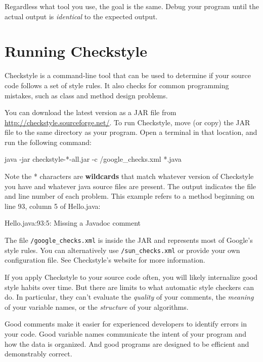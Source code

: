 \documentclass[12pt]{book}
\theoremstyle{exercise}
\newcommand{\java}[1]{\verb"#1"}
\begin{document}
Regardless what tool you use, the goal is the same.
Debug your program until the actual output is {\it identical} to the expected output.


\section{Running Checkstyle}
\label{checkstyle}

Checkstyle is a command-line tool that can be used to determine if your source code follows a set of style rules.
It also checks for common programming mistakes, such as class and method design problems.

You can download the latest version as a JAR file from \url{http://checkstyle.sourceforge.net/}.
To run Checkstyle, move (or copy) the JAR file to the same directory as your program.
Open a terminal in that location, and run the following command:

\begin{stdout}
java -jar checkstyle-*-all.jar -c /google_checks.xml *.java
\end{stdout}

Note the * characters are {\bf wildcards} that match whatever version of Checkstyle you have and whatever java source files are present.
The output indicates the file and line number of each problem.
This example refers to a method beginning on line 93, column 5 of Hello.java:

\begin{stdout}
Hello.java:93:5: Missing a Javadoc comment
\end{stdout}

The file \java{/google_checks.xml} is inside the JAR and represents most of Google's style rules.
You can alternatively use \java{/sun_checks.xml} or provide your own configuration file.
See Checkstyle's website for more information.

If you apply Checkstyle to your source code often, you will likely internalize good style habits over time.
But there are limits to what automatic style checkers can do.
In particular, they can't evaluate the {\em quality} of your comments, the {\em meaning} of your variable names, or the {\em structure} of your algorithms.

Good comments make it easier for experienced developers to identify errors in your code.
Good variable names communicate the intent of your program and how the data is organized.
And good programs are designed to be efficient and demonstrably correct.
\end{document}

